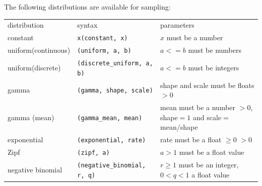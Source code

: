 \documentclass[hidelinks,11pt]{article}
\newcommand{\sq}{\textquotesingle}
\begin{document}
The following distributions are available for sampling:

{\small\centering
  \begin{longtable}{ p{3cm} p{5cm} p{5.5cm}}
    distribution & syntax & parameters\\
    constant & \texttt{x}\newline \texttt{(\sq constant\sq, x)}
    & $x$ must
    be a number\\
    uniform\newline (continuous) & \texttt{(\sq uniform\sq, a, b)} & $a<=b$
    must be numbers\\
    uniform\newline (discrete) & \texttt{(\sq discrete\_uniform\sq, a, b)} &
    $a<=b$ must be integers\\
    gamma & \texttt{(\sq gamma\sq, shape, scale)} & shape and scale must be
    floats $>0$\\
    gamma (mean) & \texttt{(\sq gamma\_mean\sq, mean)} & mean must be a number
    $>0$, shape$=1$ and scale$=$mean/shape\\
    exponential & \texttt{(\sq exponential\sq, rate)} & rate must be a float
    $\ge0$ $>0$\\
    Zipf & \texttt{(\sq zipf\sq, a)} & $a>1$ must be a float value\\
    negative binomial & \texttt{(\sq negative\_binomial\sq, r, q)} & $r\ge 1$
    must be an integer, \newline $0<q<1$ a float value\\
  \end{longtable}
}
\end{document}
